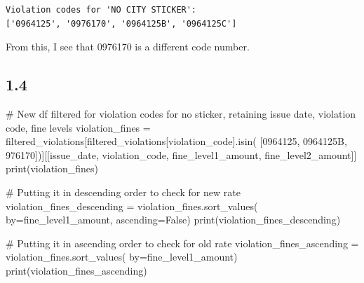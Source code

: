 \documentclass[
  letterpaper,
  DIV=11,
  numbers=noendperiod]{scrartcl}
\newenvironment{Shaded}{\begin{snugshade}}{\end{snugshade}}
\newcommand{\BuiltInTok}[1]{\textcolor[rgb]{0.00,0.23,0.31}{#1}}
\newcommand{\CommentTok}[1]{\textcolor[rgb]{0.37,0.37,0.37}{#1}}
\newcommand{\NormalTok}[1]{\textcolor[rgb]{0.00,0.23,0.31}{#1}}
\newcommand{\OperatorTok}[1]{\textcolor[rgb]{0.37,0.37,0.37}{#1}}
\newcommand{\StringTok}[1]{\textcolor[rgb]{0.13,0.47,0.30}{#1}}
\newcommand{\VariableTok}[1]{\textcolor[rgb]{0.07,0.07,0.07}{#1}}
\begin{document}
\begin{verbatim}
Violation codes for 'NO CITY STICKER':
['0964125', '0976170', '0964125B', '0964125C']
\end{verbatim}

From this, I see that 0976170 is a different code number.

\subsection{1.4}\label{section-2}

\begin{Shaded}
\begin{Highlighting}[]
\CommentTok{\# New df filtered for violation codes for no sticker, retaining issue date, violation code, fine levels}
\NormalTok{violation\_fines }\OperatorTok{=}\NormalTok{ filtered\_violations[filtered\_violations[}\StringTok{\textquotesingle{}violation\_code\textquotesingle{}}\NormalTok{].isin(}
\NormalTok{    [}\StringTok{\textquotesingle{}0964125\textquotesingle{}}\NormalTok{, }\StringTok{\textquotesingle{}0964125B\textquotesingle{}}\NormalTok{, }\StringTok{\textquotesingle{}976170\textquotesingle{}}\NormalTok{])][[}\StringTok{\textquotesingle{}issue\_date\textquotesingle{}}\NormalTok{, }\StringTok{\textquotesingle{}violation\_code\textquotesingle{}}\NormalTok{, }\StringTok{\textquotesingle{}fine\_level1\_amount\textquotesingle{}}\NormalTok{, }\StringTok{\textquotesingle{}fine\_level2\_amount\textquotesingle{}}\NormalTok{]]}
\BuiltInTok{print}\NormalTok{(violation\_fines)}

\CommentTok{\# Putting it in descending order to check for new rate}
\NormalTok{violation\_fines\_descending }\OperatorTok{=}\NormalTok{ violation\_fines.sort\_values(}
\NormalTok{    by}\OperatorTok{=}\StringTok{\textquotesingle{}fine\_level1\_amount\textquotesingle{}}\NormalTok{, ascending}\OperatorTok{=}\VariableTok{False}\NormalTok{)}
\BuiltInTok{print}\NormalTok{(violation\_fines\_descending)}

\CommentTok{\# Putting it in ascending order to check for old rate}
\NormalTok{violation\_fines\_ascending }\OperatorTok{=}\NormalTok{ violation\_fines.sort\_values(}
\NormalTok{    by}\OperatorTok{=}\StringTok{\textquotesingle{}fine\_level1\_amount\textquotesingle{}}\NormalTok{)}
\BuiltInTok{print}\NormalTok{(violation\_fines\_ascending)}
\end{Highlighting}
\end{Shaded}
\end{document}
